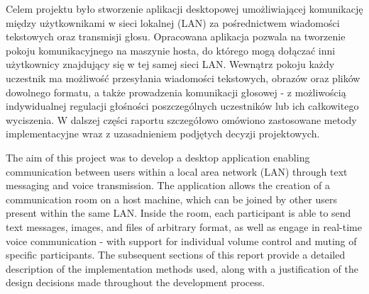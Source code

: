 
\begin{abstracts}
	\AbstractPL
	Celem projektu było stworzenie aplikacji desktopowej umożliwiającej komunikację
	między użytkownikami w sieci lokalnej (LAN) za pośrednictwem wiadomości tekstowych
	oraz transmisji głosu. Opracowana aplikacja pozwala na tworzenie pokoju
	komunikacyjnego na maszynie hosta, do którego mogą dołączać inni użytkownicy
	znajdujący się w tej samej sieci LAN. Wewnątrz pokoju każdy uczestnik ma możliwość
	przesyłania wiadomości tekstowych, obrazów oraz plików dowolnego formatu,
	a także prowadzenia komunikacji głosowej - z możliwością indywidualnej regulacji
	głośności poszczególnych uczestników lub ich całkowitego wyciszenia.
	W dalszej części raportu szczegółowo omówiono zastosowane metody implementacyjne
	wraz z uzasadnieniem podjętych decyzji projektowych.
	
	\AbstractENG
	The aim of this project was to develop a desktop application enabling communication
	between users within a local area network (LAN) through text messaging and voice
	transmission. The application allows the creation of a communication room on a host
	machine, which can be joined by other users present within the same LAN. Inside the
	room, each participant is able to send text messages, images, and files of arbitrary
	format, as well as engage in real-time voice communication - with support for
	individual volume control and muting of specific participants.
	The subsequent sections of this report provide a detailed description of the
	implementation methods used, along with a justification of the design decisions
	made throughout the development process.
\end{abstracts}

